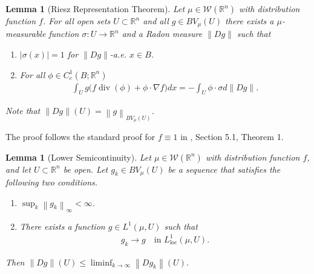 \documentclass[12pt]{amsart}
\numberwithin{equation}{section}
\theoremstyle{plain}
\newtheorem{lemma}[theorem]{Lemma}
\theoremstyle{definition}
\newcommand{\norm}[1]{\left\lVert#1\right\rVert}
\begin{document}
\begin{lemma}[Riesz Representation Theorem]\label{RRT}
    Let $\mu \in \mathscr{W}(\mathbb{R}^n)$ with distribution function $f$.  For all open sets $U \subset \mathbb{R}^n$ and all $g \in BV_{\mu}(U)$ there exists a $\mu$-measurable function $\sigma: U \rightarrow \mathbb{R}^n$ and a Radon measure $\norm{Dg}$ such that 
    \begin{enumerate}
        \item $|\sigma(x)| = 1$ for $\norm{Dg}$-a.e. $x \in B$.
        \item For all $\phi \in C^1_c(B; \mathbb{R}^n)$ 
        \begin{align*}
            \int_{U}g\Big(f \operatorname{div}(\phi) + \phi \cdot \nabla f\Big) dx = - \int_U \phi \cdot \sigma d\norm{Dg}.
        \end{align*}
    \end{enumerate}
    Note that $\norm{Dg}(U) = \norm{g}_{BV_{\mu}(U)}$.
\end{lemma}

The proof follows the standard proof for $f \equiv 1$ in \cite{evansgariepy}, Section 5.1, Theorem 1.

\begin{lemma}[Lower Semicontinuity]\label{l:lsc}
Let $\mu \in \mathscr{W}(\mathbb{R}^n)$ with distribution function $f$, and let $U \subset \mathbb{R}^n$ be open.  Let $g_k \in BV_{\mu}(U)$ be a sequence that satisfies the following two conditions.
    \begin{enumerate}
        \item $\sup_k \norm{g_k}_{\infty}< \infty$.
        \item There exists a function $g \in L^1(\mu, U)$ such that \begin{align*}
        g_k \rightarrow g \quad \text{in  } L^1_{\text{loc}}(\mu, U).
    \end{align*}
    \end{enumerate}
    Then $\norm{Dg}(U) \le \liminf_{k \rightarrow \infty}\norm{Dg_k}(U)$.
\end{lemma}
\end{document}
